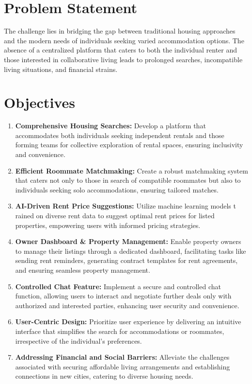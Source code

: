 \section{Problem Statement}
The challenge lies in bridging the gap between traditional housing approaches
and the modern needs of individuals seeking varied accommodation options.
The absence of a centralized platform that caters to both the individual
renter and those interested in collaborative living leads to prolonged
searches, incompatible living situations, and financial strains.

\section{Objectives}
\begin{enumerate}
    \item \textbf{Comprehensive Housing Searches:} Develop a platform that accommodates
          both individuals seeking independent rentals and those forming teams for
          collective exploration of rental spaces, ensuring inclusivity and
          convenience.
    \item \textbf{Efficient Roommate Matchmaking:} Create a robust matchmaking system
          that caters not only to those in search of compatible roommates but also to
          individuals seeking solo accommodations, ensuring tailored matches.
    \item \textbf{AI-Driven Rent Price Suggestions:} Utilize machine learning models t
          rained on diverse rent data to suggest optimal rent prices for listed
          properties, empowering users with informed pricing strategies.
    \item \textbf{Owner Dashboard \& Property Management:} Enable property owners to manage their
          listings through a dedicated dashboard, facilitating tasks like sending rent
          reminders, generating contract templates for rent agreements, and ensuring seamless
          property management.
    \item \textbf{Controlled Chat Feature:} Implement a secure and controlled chat function, allowing
          users to interact and negotiate further deals only with authorized and interested
          parties, enhancing user security and convenience.
    \item \textbf{User-Centric Design:} Prioritize user experience by delivering an intuitive
          interface that simplifies the search for accommodations or roommates,
          irrespective of the individual's preferences.
    \item \textbf{Addressing Financial and Social Barriers:} Alleviate the challenges associated
          with securing affordable living arrangements and establishing connections in
          new cities, catering to diverse housing needs.
\end{enumerate}

